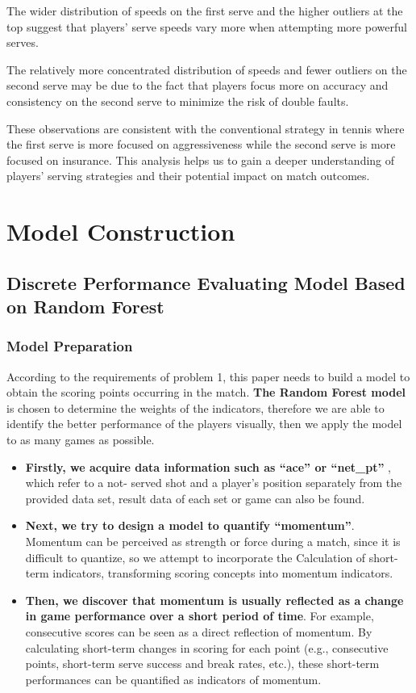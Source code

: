 \documentclass{mcmthesis}
\begin{document}
    The wider distribution of speeds on the first serve and the higher outliers at the top suggest
that players' serve speeds vary more when attempting more powerful serves. 

    The relatively more concentrated distribution of speeds and fewer outliers on the second
serve may be due to the fact that players focus more on accuracy and consistency on the second
serve to minimize the risk of double faults.

    These observations are consistent with the conventional strategy in tennis where the first
serve is more focused on aggressiveness while the second serve is more focused on insurance. This analysis helps us to gain a deeper understanding of players' serving strategies and their
potential impact on match outcomes.

\section{Model Construction}

\subsection{Discrete Performance Evaluating Model Based on Random Forest}

\subsubsection{Model Preparation}

    According to the requirements of problem 1, this paper needs to build a model to obtain the
scoring points occurring in the match. {\bf The Random Forest model} is chosen to determine the
weights of the indicators, therefore we are able to identify the better performance of the players
visually, then we apply the model to as many games as possible.

\begin{itemize}
\item {\bf Firstly, we acquire data information such as “ace” or “net\_pt”} , which refer to a not- served shot and a player’s position separately from the provided data set, result data of each set
or game can also be found.
        
\item {\bf Next, we try to design a model to quantify “momentum”}. Momentum can be perceived as
strength or force during a match, since it is difficult to quantize, so we attempt to incorporate the
Calculation of short-term indicators, transforming scoring concepts into momentum indicators.
    
\item {\bf Then, we discover that momentum is usually reflected as a change in game
performance over a short period of time}. For example, consecutive scores can be seen as a
direct reflection of momentum. By calculating short-term changes in scoring for each point
(e.g., consecutive points, short-term serve success and break rates, etc.), these short-term
performances can be quantified as indicators of momentum.

\end{itemize}
\end{document}
